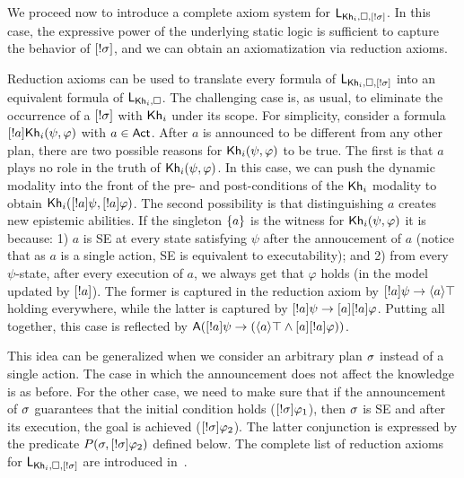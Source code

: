 We proceed now to introduce a complete axiom system for $\mathsf{L}_{{\sf Kh}_i,\square,[!\sigma]}$. In this case, the expressive power of the underlying static logic is sufficient to capture the behavior of $[!\sigma]$, and we can obtain an axiomatization via reduction axioms.

Reduction axioms can be used to translate every formula of $\mathsf{L}_{{\sf Kh}_i,\square,[!\sigma]}$ into an equivalent formula of $\mathsf{L}_{{\sf Kh}_i,\square}$. The challenging case is, as usual, to eliminate the occurrence of a $[!\sigma]$ with ${\sf Kh}_i$ under its scope. For simplicity, consider a formula $[!a]{\sf Kh}_i(\psi,\varphi)$ with $a\in{\rm \sf Act}$. After $a$ is announced to be different from any other plan, there are two possible reasons for ${\sf Kh}_i(\psi,\varphi)$ to be true. The first is that $a$ plays no role in the truth of ${\sf Kh}_i(\psi,\varphi)$. In this case, we can push the dynamic modality into the front of the pre- and post-conditions of the ${\sf Kh}_i$ modality to obtain ${\sf Kh}_i([!a]\psi,[!a]\varphi)$. The second possibility is that distinguishing $a$ creates new epistemic abilities. If the singleton $\{ a \}$ is the witness for ${\sf Kh}_i(\psi,\varphi)$ it is because: 1) $a$ is SE at every state satisfying $\psi$ after the annoucement of $a$ (notice that as $a$ is a single action, SE is equivalent to executability); and 2) from every $\psi$-state, after every execution of $a$, we always get that $\varphi$ holds (in the model updated by $[!a]$). The former is captured in the reduction axiom by $[!a]\psi \rightarrow \langle a \rangle\top$ holding everywhere, while the latter is captured by $[!a]\psi \rightarrow [a][!a]\varphi$. Putting all together, this case is reflected by ${\sf A}([!a]\psi\rightarrow(\langle a \rangle\top\wedge[a][!a]\varphi))$.

This idea can be generalized when we consider an arbitrary plan $\sigma$ instead of a single action. The case in which the announcement does not affect the knowledge is as before. For the other case, we need to make sure that if the announcement of $\sigma$ guarantees that the initial condition holds ($[!\sigma]\varphi_1$), then $\sigma$ is SE and after its execution, the goal is achieved ($[!\sigma]\varphi_2$). 
The latter conjunction is expressed by the predicate $P(\sigma,[!\sigma]\varphi_2)$ defined below. The complete list of reduction axioms for $\mathsf{L}_{{\sf Kh}_i,\square,[!\sigma]}$ are introduced in~.

